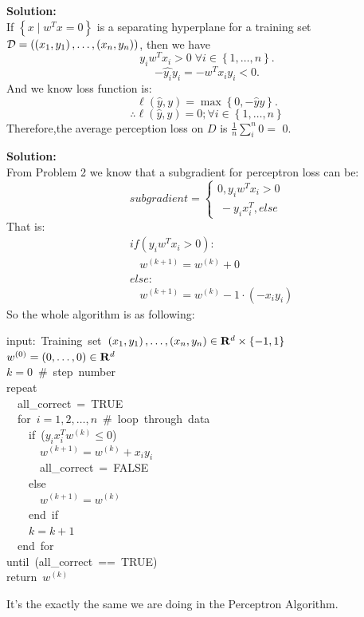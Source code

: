\documentclass[ruled]{article}
\newenvironment{lyxcode}
{\par\begin{list}{}{
\setlength{\rightmargin}{\leftmargin}
\setlength{\listparindent}{0pt}%
\raggedright
\setlength{\itemsep}{0pt}
\setlength{\parsep}{0pt}
\normalfont\ttfamily}%
 \item[]}
{\end{list}}
\begin{document}
\begin{enumerate}
\item 
\textbf{Solution:}\\
If $\left\{ x\mid w^{T}x=0\right\} $ is a separating hyperplane
for a training set $\mathcal{D}=\left(\left(x_{1},y_{1}\right),\ldots,(x_{n},y_{n})\right)$, then we have \[
y_{i}w^{T}x_{i}>0\;\forall i\in\left\{ 1,\ldots,n\right\} .
\]
\[-\hat{y_{i}}y_{i} = - w^{T}x_{i}y_{i} < 0.\]
And we know loss function is:
\[
\ell(\hat{y},y)=\max\left\{ 0,-\hat{y}y\right\} .\]
\[\therefore \ell(\hat{y},y)= 0; \forall i\in\left\{ 1,\ldots,n\right\}\]
Therefore,the average perception loss on $D$ is $\frac{1}{n} \sum_{i}^n 0=$ 0.


\item 
\textbf{Solution:}\\
From Problem 2 we know that a subgradient for perceptron loss can be:
\begin{equation}
subgradient=\left\{
\begin{aligned}
0, y_{i}w^Tx_{i} > 0\\
\ -y_{i}x_{i}^T, else
\end{aligned}
\right.
\end{equation}
That is:
\begin{align*}
    & if (y_{i}w^Tx_{i} > 0):\\
    & ~~~~w^{(k+1)}=w^{(k)}+0\\
    & else:\\
    & ~~~~w^{(k+1)}=w^{(k)}-1 \cdot (-x_{i}y_{i} )
\end{align*}
So the whole algorithm is as following:

\begin{lyxcode}
input:~Training~set~$\left(x_{1},y_{1}\right),\ldots,(x_{n},y_{n})\in\mathbf{R}^{d}\times\left\{ -1,1\right\} $~\\
$w^{(0)}=\left(0,\ldots,0\right)\in\mathbf{R}^{d}$~\\
$k=0$~\#~step~number~\\
repeat~\\
~~all\_correct~=~TRUE~\\
~~for~$i=1,2,\ldots,n$~\#~loop~through~data~\\
~~~~if~($y_{i}x_{i}^{T}w^{(k)}\le0$)~\\
~~~~~~$w^{(k+1)}=w^{(k)}+x_{i}y_{i}$~\\
~~~~~~all\_correct~=~FALSE~\\
~~~~else~\\
~~~~~~$w^{(k+1)}=w^{(k)}$~\\
~~~~end~if~\\
~~~~$k=k+1$~\\
~~end~for~\\
until~(all\_correct~==~TRUE)~\\
return~$w^{(k)}$~\\
\end{lyxcode}
It's the exactly the same we are doing in the Perceptron Algorithm.




\end{enumerate}
\end{document}
